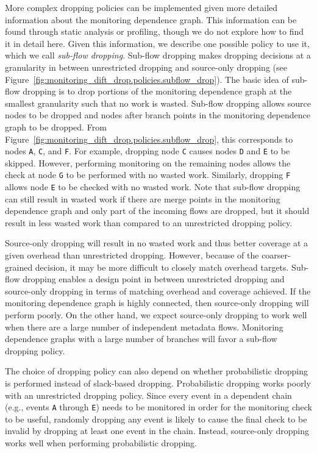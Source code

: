 More complex dropping policies can be implemented given more detailed
information about the monitoring dependence graph. This information can be
found through static analysis or profiling, though we do not explore how to
find it in detail here. Given this information, we describe one possible policy
to use it, which we call \emph{sub-flow dropping}. Sub-flow dropping makes
dropping decisions at a granularity in between unrestricted dropping and
source-only dropping (see
Figure~\ref{fig:monitoring_dift_drop.policies.subflow_drop}).  The basic idea
of sub-flow dropping is to drop portions of the monitoring dependence graph at
the smallest granularity such that no work is wasted.  Sub-flow dropping allows
source nodes to be dropped and nodes after branch points in the monitoring
dependence graph to be dropped. From
Figure~\ref{fig:monitoring_dift_drop.policies.subflow_drop}, this corresponds
to nodes {\tt A}, {\tt C}, and {\tt F}. For example, dropping node {\tt C}
causes nodes {\tt D} and {\tt E} to be skipped. However, performing monitoring
on the remaining nodes allows the check at node {\tt G} to be performed with no
wasted work.  Similarly, dropping {\tt F} allows node {\tt E} to be checked
with no wasted work.  Note that sub-flow dropping can still result in wasted
work if there are merge points in the monitoring dependence graph and only part
of the incoming flows are dropped, but it should result in less wasted work
than compared to an unrestricted dropping policy. 

Source-only dropping will result in no wasted work and thus better coverage at
a given overhead than unrestricted dropping. However, because of the
coarser-grained decision, it may be more difficult to closely match overhead
targets.  Sub-flow dropping enables a design point in between unrestricted
dropping and source-only dropping in terms of matching overhead and coverage
achieved.  If the monitoring dependence graph is highly connected, then
source-only dropping will perform poorly. On the other hand, we expect
source-only dropping to work well when there are a large number of independent
metadata flows.  Monitoring dependence graphs with a large number of branches
will favor a sub-flow dropping policy.

The choice of dropping policy can also depend on whether probabilistic dropping
is performed instead of slack-based dropping.  Probabilistic dropping works
poorly with an unrestricted dropping policy. Since every event in a dependent
chain (e.g., events {\tt A} through {\tt E}) needs to be monitored in order for
the monitoring check to be useful, randomly dropping any event is likely to
cause the final check to be invalid by dropping at least one event in the
chain. Instead, source-only dropping works well when performing probabilistic
dropping.

